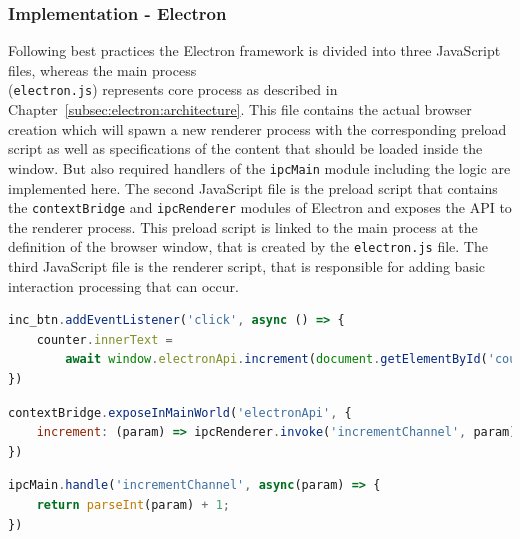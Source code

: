 \subsubsection{Implementation - Electron}
\label{subsubsec:impl:electron}
Following best practices the Electron framework is divided into three JavaScript files, whereas the main process \\(\texttt{electron.js}) represents core process as described in Chapter~\ref{subsec:electron:architecture}.
This file contains the actual browser creation which will spawn a new renderer process  with the corresponding preload script as well as specifications of the content that should be loaded inside the window.
But also required handlers of the \texttt{ipcMain} module including the logic are implemented here.
The second JavaScript file is the preload script that contains the \texttt{contextBridge}  and \texttt{ipcRenderer} modules of Electron and exposes the \ac{API} to the renderer process.
This preload script is linked to the main process at the definition of the browser window, that is created by the \texttt{electron.js} file.
The third JavaScript file is the renderer script, that is responsible for adding basic interaction processing that can occur.

\begin{lstlisting}[language=JavaScript,label={lst:rendererjs}, caption={Excerpt of render.js}]
inc_btn.addEventListener('click', async () => {
    counter.innerText =
        await window.electronApi.increment(document.getElementById('counter').innerText)
})
\end{lstlisting}
\begin{lstlisting}[language=JavaScript,label={lst:preloadjs}, caption={Excerpt of preload.js}]
contextBridge.exposeInMainWorld('electronApi', {
    increment: (param) => ipcRenderer.invoke('incrementChannel', param)
})
\end{lstlisting}
\begin{lstlisting}[language=JavaScript,label={lst:electronjs}, caption={Excerpt of electron.js}]
ipcMain.handle('incrementChannel', async(param) => {
    return parseInt(param) + 1;
})
\end{lstlisting}

